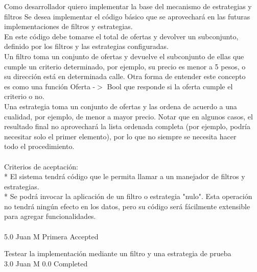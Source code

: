 	{Como desarrollador quiero implementar la base del mecanismo de estrategias y filtros} %
	{Se desea implementar el código básico que se aprovechará en las futuras\\
implementaciones de filtros y estrategias.\\
En este código debe tomarse el total de ofertas y devolver un subconjunto,\\
definido por los filtros y  las estrategias configuradas.\\
Un filtro toma un conjunto de ofertas y devuelve el subconjunto de ellas que\\
cumple un criterio determinado, por ejemplo, su precio es menor a 5 pesos, o\\
su dirección está en determinada calle. Otra forma de entender este concepto\\
es como una función Oferta -$>$  Bool que responde si la oferta cumple el\\
criterio o no.\\
Una estrategia toma un conjunto de ofertas y las ordena de acuerdo a una\\
cualidad, por ejemplo, de menor a mayor precio. Notar que en algunos casos, el\\
resultado final no aprovechará la lista ordenada completa (por ejemplo, podría\\
necesitar solo el primer elemento), por lo que no siempre se necesita hacer\\
todo el procedimiento.\\
  \\
Criterios de aceptación:\\
* El sistema tendrá código que le permita llamar a un manejador de filtros y estrategias.  \\
* Se podrá invocar la aplicación de un filtro o estrategia "nulo". Esta operación no tendrá ningún efecto en los datos, pero su código será fácilmente extensible para agregar funcionalidades.  \\
  \\
} %
	{} %
	{5.0} %
	{Juan M} %
	{Primera} %
	{Accepted} %

		{Testear la implementación mediante un filtro y una estrategia de prueba} %
		{\\
} %
		{3.0} %
		{Juan M} %
		{0.0} %
		{Completed} %


